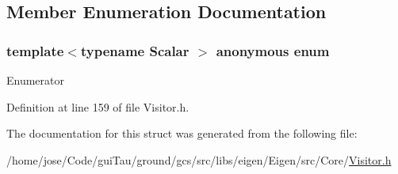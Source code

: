 \subsection{Member Enumeration Documentation}
\hypertarget{structei__functor__traits_3_01ei__max__coeff__visitor_3_01_scalar_01_4_01_4_a6746fcf8051282fc6603ee987a7c6738}{\subsubsection[{anonymous enum}]{\setlength{\rightskip}{0pt plus 5cm}template$<$typename Scalar $>$ anonymous enum}}\label{structei__functor__traits_3_01ei__max__coeff__visitor_3_01_scalar_01_4_01_4_a6746fcf8051282fc6603ee987a7c6738}
\begin{Desc}
\item[Enumerator]\par
\begin{description}
\item[{\em 
\hypertarget{structei__functor__traits_3_01ei__max__coeff__visitor_3_01_scalar_01_4_01_4_a6746fcf8051282fc6603ee987a7c6738af9888423f3f3d25c2adcebae23654c68}{Cost}\label{structei__functor__traits_3_01ei__max__coeff__visitor_3_01_scalar_01_4_01_4_a6746fcf8051282fc6603ee987a7c6738af9888423f3f3d25c2adcebae23654c68}
}]\end{description}
\end{Desc}


Definition at line 159 of file Visitor.\-h.



The documentation for this struct was generated from the following file\-:\begin{DoxyCompactItemize}
\item 
/home/jose/\-Code/gui\-Tau/ground/gcs/src/libs/eigen/\-Eigen/src/\-Core/\hyperlink{_visitor_8h}{Visitor.\-h}\end{DoxyCompactItemize}
